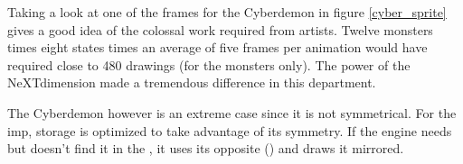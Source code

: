 \par
Taking a look at one of the frames for the Cyberdemon in figure \ref{cyber_sprite} gives a good idea of the colossal work required from artists. Twelve monsters times eight states times an average of five frames per animation would have required close to 480 drawings (for the monsters only). The power of the NeXTdimension made a tremendous difference in this department.\\
\par
The Cyberdemon however is an extreme case since it is not symmetrical. For the imp, storage is optimized to take advantage of its symmetry. If the engine needs  but doesn't find it in the , it uses its opposite () and draws it mirrored.\\ 
\par
{}




\begin{figure}[H] \centering
{}
\end{figure}
\par
{}\\
\par 
{}





